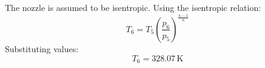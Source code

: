 The nozzle is assumed to be isentropic. Using the isentropic relation:  
\[
T_6 = T_5 \left( \frac{p_6}{p_5} \right)^{\frac{\kappa-1}{\kappa}}
\]  
Substituting values:  
\[
T_6 = 328.07 \, \text{K}
\]